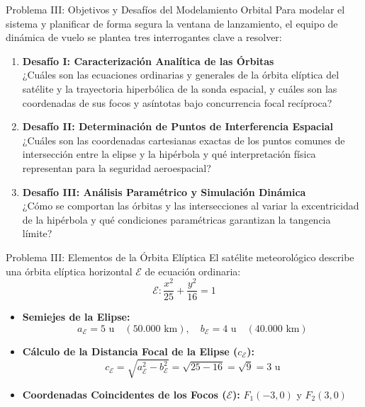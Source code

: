 \documentclass[aspectratio=169]{beamer}
\begin{document}
\begin{frame}{Problema III: Objetivos y Desafíos del Modelamiento Orbital}
  Para modelar el sistema y planificar de forma segura la ventana de lanzamiento, el equipo de dinámica de vuelo se plantea tres interrogantes clave a resolver:
  \vspace{0.4cm}
  \begin{enumerate}
    \item \textbf{Desafío I: Caracterización Analítica de las Órbitas} \\
      ¿Cuáles son las ecuaciones ordinarias y generales de la órbita elíptica del satélite y la trayectoria hiperbólica de la sonda espacial, y cuáles son las coordenadas de sus focos y asíntotas bajo concurrencia focal recíproca?
    \vspace{0.2cm}
    \item \textbf{Desafío II: Determinación de Puntos de Interferencia Espacial} \\
      ¿Cuáles son las coordenadas cartesianas exactas de los puntos comunes de intersección entre la elipse y la hipérbola y qué interpretación física representan para la seguridad aeroespacial?
    \vspace{0.2cm}
    \item \textbf{Desafío III: Análisis Paramétrico y Simulación Dinámica} \\
      ¿Cómo se comportan las órbitas y las intersecciones al variar la excentricidad de la hipérbola y qué condiciones paramétricas garantizan la tangencia límite?
  \end{enumerate}
\end{frame}

\begin{frame}{Problema III: Elementos de la Órbita Elíptica}
  El satélite meteorológico describe una órbita elíptica horizontal $\mathcal{E}$ de ecuación ordinaria:
  \[\mathcal{E} \colon \frac{x^2}{25} + \frac{y^2}{16} = 1\]
  \vspace{0.2cm}
  \begin{itemize}
    \item \textbf{Semiejes de la Elipse:}
      \[a_{\mathcal{E}} = 5\text{~u} \quad (50.000\text{~km}), \quad b_{\mathcal{E}} = 4\text{~u} \quad (40.000\text{~km})\]
    \item \textbf{Cálculo de la Distancia Focal de la Elipse ($c_{\mathcal{E}}$):}
      \[c_{\mathcal{E}} = \sqrt{a_{\mathcal{E}}^2 - b_{\mathcal{E}}^2} = \sqrt{25 - 16} = \sqrt{9} = 3\text{~u}\]
    \item \textbf{Coordenadas Coincidentes de los Focos ($\mathcal{E}$):}
      $F_1(-3, 0)$ y $F_2(3, 0)$
  \end{itemize}
\end{frame}
\end{document}

